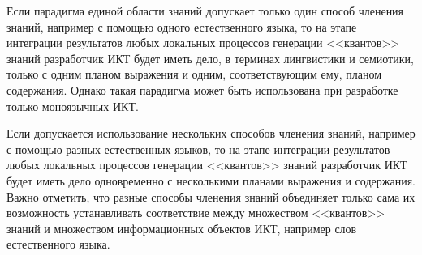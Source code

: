 \begin{multicols}{2}
      Если парадигма единой области знаний допускает только один способ членения знаний,
например с помощью одного естественного языка, то на этапе интеграции результатов любых
локальных процессов генерации <<квантов>> знаний разработчик ИКТ будет иметь дело, в
терминах лингвистики и семиотики, только с одним планом выражения и одним,
соответствующим ему, планом содержания. Однако такая парадигма может быть использована
при разработке только моноязычных ИКТ.

      Если допускается использование нескольких способов членения знаний, например с
помощью разных естественных языков, то на этапе интеграции результатов любых локальных
процессов генерации <<квантов>> знаний разработчик ИКТ будет иметь дело одновременно с
несколькими планами выражения и содержания. Важно отметить, что разные способы членения
знаний объединяет только сама их возможность устанавливать соответствие между множеством
<<квантов>> знаний и множеством информационных объектов ИКТ, например слов
естественного языка.


\end{multicols}
